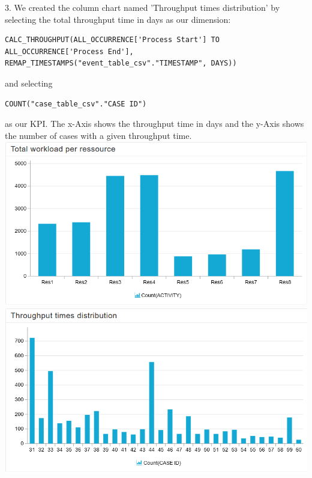 \documentclass[../../main.tex]{subfiles}
\begin{document}
3. We created the column chart named 'Throughput times distribution' by selecting the total throughput time in days as our dimension:
\begin{verbatim}
CALC_THROUGHPUT(ALL_OCCURRENCE['Process Start'] TO ALL_OCCURRENCE['Process End'], REMAP_TIMESTAMPS("event_table_csv"."TIMESTAMP", DAYS))
\end{verbatim}
and selecting
\begin{verbatim}
COUNT("case_table_csv"."CASE ID")
\end{verbatim}
as our KPI. The x-Axis shows the throughput time in days and the y-Axis shows the number of cases with a given throughput time.\\
\includegraphics[width=0.5\columnwidth]{img/Celonis_d_workload.png}
\includegraphics[width=0.5\columnwidth]{img/Celonis_d_throughput_times.png}\\
\end{document}
